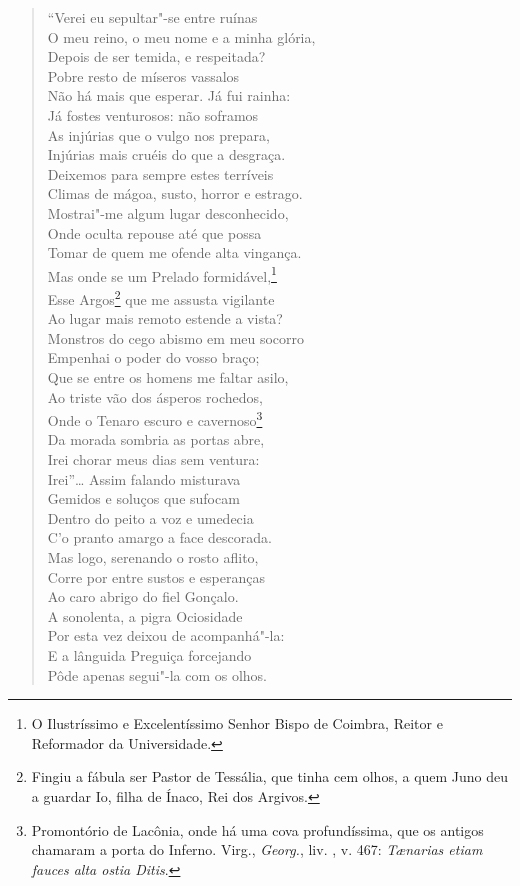 \begin{verse}
``Verei eu sepultar"-se entre ruínas\\
O meu reino, o meu nome e a minha glória,\\
Depois de ser temida, e respeitada?\\
Pobre resto de míseros vassalos\\
Não há mais que esperar. Já fui rainha:\\
Já fostes venturosos: não soframos\\
As injúrias que o vulgo nos prepara,\\
Injúrias mais cruéis do que a desgraça.\\
Deixemos para sempre estes terríveis\\
Climas de mágoa, susto, horror e estrago.\\
Mostrai"-me algum lugar desconhecido,\\
Onde oculta repouse até que possa\\
Tomar de quem me ofende alta vingança.\\
Mas onde se um Prelado formidável,\footnote{ O Ilustríssimo e
Excelentíssimo Senhor Bispo de Coimbra, Reitor e Reformador da Universidade.}\\
Esse Argos\footnote{ Fingiu a fábula ser Pastor de Tessália, que tinha
cem olhos, a quem Juno deu a guardar Io, filha de Ínaco, Rei dos Argivos.} que
me assusta vigilante\\			\index{\Fabula}
Ao lugar mais remoto estende a vista?\\
Monstros do cego abismo em meu socorro\\
Empenhai o poder do vosso braço;\\
Que se entre os homens me faltar asilo,\\
Ao triste vão dos ásperos rochedos,\\
Onde o Tenaro escuro e cavernoso\footnote{ Promontório de Lacônia,
onde há uma cova profundíssima, que os antigos chamaram a porta do Inferno.
Virg., \textit{Georg.}, liv. , v. 467: \textit{T\ae narias etiam fauces alta
ostia Ditis}.}\\
Da morada sombria as portas abre,\\
Irei chorar meus dias sem ventura:\\
Irei''\ldots{} Assim falando misturava\\
Gemidos e soluços que sufocam\\
Dentro do peito a voz e umedecia\\
C'o pranto amargo a face descorada.\\
Mas logo, serenando o rosto aflito,\\
Corre por entre sustos e esperanças\\
Ao caro abrigo do fiel Gonçalo.\\
A sonolenta, a pigra Ociosidade\\
Por esta vez deixou de acompanhá"-la:\\
E a lânguida Preguiça forcejando\\
Pôde apenas segui"-la com os olhos. \\[10pt]



\end{verse}
